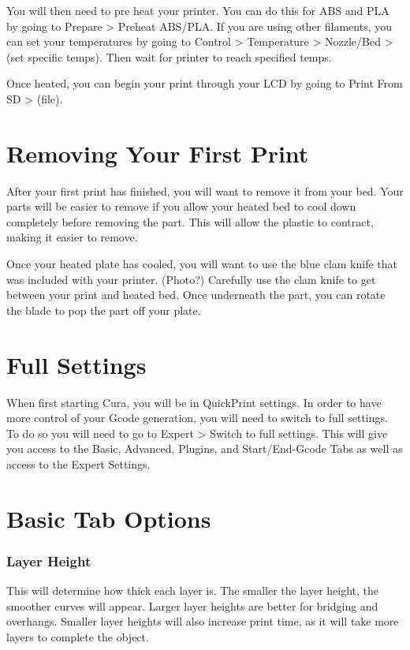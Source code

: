 You will then need to pre heat your printer. You can do this for ABS and PLA by going to Prepare > Preheat ABS/PLA. If you are using other filaments, you can set your temperatures by going to Control > Temperature > Nozzle/Bed > (set specific temps). Then wait for printer to reach specified temps.

Once heated, you can begin your print through your LCD by going to Print From SD > (file).

\section{Removing Your First Print}

After your first print has finished, you will want to remove it from your bed. Your parts will be easier to remove if you allow your heated bed to cool down completely before removing the part. This will allow the plastic to contract, making it easier to remove.

Once your heated plate has cooled, you will want to use the blue clam knife that was included with your printer. (Photo?) Carefully use the clam knife to get between your print and heated bed. Once underneath the part, you can rotate the blade to pop the part off your plate.

\section{Full Settings}

When first starting Cura, you will be in QuickPrint settings. In order to have more control of your Gcode generation, you will need to switch to full settings. To do so you will need to go to Expert > Switch to full settings. This will give you access to the Basic, Advanced, Plugins, and Start/End-Gcode Tabs as well as access to the Expert Settings.

\section{Basic Tab Options}

\subsubsection{Layer Height}

This will determine how thick each layer is. The smaller the layer height, the smoother curves will appear. Larger layer heights are better for bridging and overhangs. Smaller layer heights will also increase print time, as it will take more layers to complete the object.

